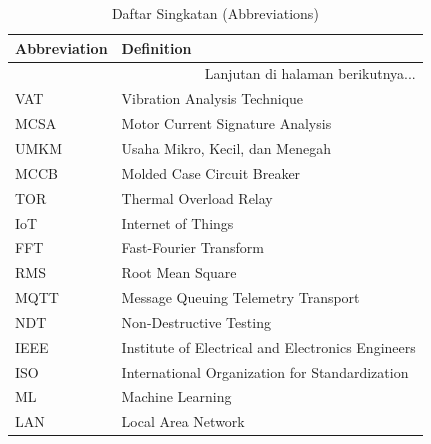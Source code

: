 \documentclass{elsinta}
\begin{document}
\begin{longtable}{|p{4cm}|p{11cm}|} %
    \caption{Daftar Singkatan (Abbreviations)}\\
    \hline
    \textbf{Abbreviation} & \textbf{Definition} \\
    \hline
    \endhead %
    
    \hline 
    \multicolumn{2}{|r|}{Lanjutan di halaman berikutnya...} \\ 
    \endfoot %
    
    \hline
    \endlastfoot %

    VAT & Vibration Analysis Technique \\
    \hline
    MCSA & Motor Current Signature Analysis \\
    \hline
    UMKM & Usaha Mikro, Kecil, dan Menegah\\
    \hline
    MCCB & Molded Case Circuit Breaker\\
    \hline
    TOR & Thermal Overload Relay\\
    \hline
    IoT & Internet of Things \\
    \hline
    FFT & Fast-Fourier Transform\\
    \hline
    RMS & Root Mean Square \\
    \hline
    MQTT & Message Queuing Telemetry Transport \\
    \hline
    NDT & Non-Destructive Testing \\
    \hline
    IEEE & Institute of Electrical and Electronics Engineers \\
    \hline
    ISO & International Organization for Standardization \\
    \hline
    ML & Machine Learning \\
    \hline
    LAN & Local Area Network \\
    \hline
    

\end{longtable}

\end{document}
